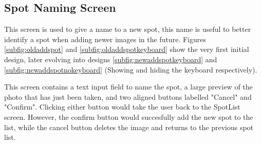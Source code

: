 \subsection{Spot Naming Screen}
This screen is used to give a name to a new spot, this name is useful to better identify a spot when adding newer images in the future. Figures \ref{subfig:oldaddspot} and \ref{subfig:oldaddspotkeyboard} show the very first initial design, later evolving into designs \ref{subfig:newaddspotkeyboard} and \ref{subfig:newaddspotnokeyboard} (Showing and hiding the keyboard respectively).

This screen contains a text input field to name the spot, a large preview of the photo that has just been taken, and two aligned buttons labelled "Cancel" and "Confirm". Clicking either button would take the user back to the SpotList screen. However, the confirm button would succesfully add the new spot to the list, while the cancel button deletes the image and returns to the previous spot list.

